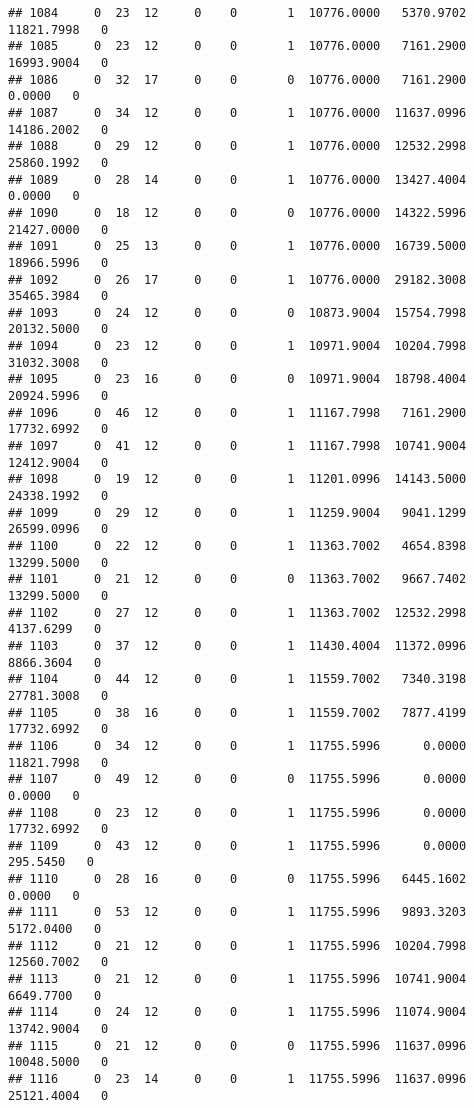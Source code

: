\documentclass[
]{article}
\begin{document}
\begin{enumerate}
\begin{verbatim}
## 1084     0  23  12     0    0       1  10776.0000   5370.9702  11821.7998   0
## 1085     0  23  12     0    0       1  10776.0000   7161.2900  16993.9004   0
## 1086     0  32  17     0    0       0  10776.0000   7161.2900      0.0000   0
## 1087     0  34  12     0    0       1  10776.0000  11637.0996  14186.2002   0
## 1088     0  29  12     0    0       1  10776.0000  12532.2998  25860.1992   0
## 1089     0  28  14     0    0       1  10776.0000  13427.4004      0.0000   0
## 1090     0  18  12     0    0       0  10776.0000  14322.5996  21427.0000   0
## 1091     0  25  13     0    0       1  10776.0000  16739.5000  18966.5996   0
## 1092     0  26  17     0    0       1  10776.0000  29182.3008  35465.3984   0
## 1093     0  24  12     0    0       0  10873.9004  15754.7998  20132.5000   0
## 1094     0  23  12     0    0       1  10971.9004  10204.7998  31032.3008   0
## 1095     0  23  16     0    0       0  10971.9004  18798.4004  20924.5996   0
## 1096     0  46  12     0    0       1  11167.7998   7161.2900  17732.6992   0
## 1097     0  41  12     0    0       1  11167.7998  10741.9004  12412.9004   0
## 1098     0  19  12     0    0       1  11201.0996  14143.5000  24338.1992   0
## 1099     0  29  12     0    0       1  11259.9004   9041.1299  26599.0996   0
## 1100     0  22  12     0    0       1  11363.7002   4654.8398  13299.5000   0
## 1101     0  21  12     0    0       0  11363.7002   9667.7402  13299.5000   0
## 1102     0  27  12     0    0       1  11363.7002  12532.2998   4137.6299   0
## 1103     0  37  12     0    0       1  11430.4004  11372.0996   8866.3604   0
## 1104     0  44  12     0    0       1  11559.7002   7340.3198  27781.3008   0
## 1105     0  38  16     0    0       1  11559.7002   7877.4199  17732.6992   0
## 1106     0  34  12     0    0       1  11755.5996      0.0000  11821.7998   0
## 1107     0  49  12     0    0       0  11755.5996      0.0000      0.0000   0
## 1108     0  23  12     0    0       1  11755.5996      0.0000  17732.6992   0
## 1109     0  43  12     0    0       1  11755.5996      0.0000    295.5450   0
## 1110     0  28  16     0    0       0  11755.5996   6445.1602      0.0000   0
## 1111     0  53  12     0    0       1  11755.5996   9893.3203   5172.0400   0
## 1112     0  21  12     0    0       1  11755.5996  10204.7998  12560.7002   0
## 1113     0  21  12     0    0       1  11755.5996  10741.9004   6649.7700   0
## 1114     0  24  12     0    0       1  11755.5996  11074.9004  13742.9004   0
## 1115     0  21  12     0    0       0  11755.5996  11637.0996  10048.5000   0
## 1116     0  23  14     0    0       1  11755.5996  11637.0996  25121.4004   0

\end{verbatim}
\end{enumerate}
\end{document}
